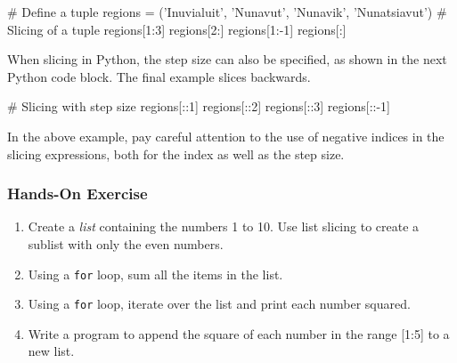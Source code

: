 \begin{samepage}
\begin{pythoncode}
# Define a tuple
regions = ('Inuvialuit', 'Nunavut', 'Nunavik', 'Nunatsiavut')
# Slicing of a tuple
regions[1:3]
regions[2:]
regions[1:-1]
regions[:]
\end{pythoncode}
\end{samepage}

When slicing in Python, the step size can also be specified, as shown in the next Python code block. The final example slices backwards.

\begin{samepage}
\begin{pythoncode}
# Slicing with step size
regions[::1]
regions[::2]
regions[::3]
regions[::-1]
\end{pythoncode}
\end{samepage}



\noindent In the above example, pay careful attention to the use of negative indices in the slicing expressions, both for the index as well as the step size.


\begin{tcolorbox}[colback=code]
\subsubsection*{Hands-On Exercise}
\begin{enumerate}
    \item Create a \emph{list} containing the numbers 1 to 10. Use list slicing to create a sublist with only the even numbers.
    \item Using a \texttt{for} loop, sum all the items in the list.
    \item Using a \texttt{for} loop, iterate over the list and print each number squared.
    \item Write a program to append the square of each number in the range [1:5] to a new list.
\end{enumerate}
\end{tcolorbox}

